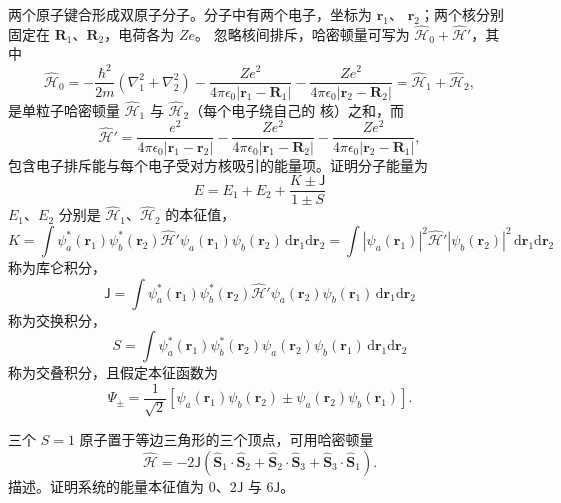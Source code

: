  两个原子键合形成双原子分子。分子中有两个电子，坐标为 $\mathbf{r}_1$、
$\mathbf{r}_2$；两个核分别固定在 $\mathbf{R}_1$、$\mathbf{R}_2$，电荷各为 $Ze$。
忽略核间排斥，哈密顿量可写为 $\hat{\mathcal{H}}_0+\hat{\mathcal{H}}'$，其中
\begin{equation*}
\hat{\mathcal{H}}_0 = -\frac{\hbar^{2}}{2m}(\nabla_1^{2}+\nabla_2^{2}) - \frac{Ze^{2}}{4\pi\epsilon_0|\mathbf{r}_1-\mathbf{R}_1|} - \frac{Ze^{2}}{4\pi\epsilon_0|\mathbf{r}_2-\mathbf{R}_2|} = \hat{\mathcal{H}}_1+\hat{\mathcal{H}}_2,\tag{4.27}
\end{equation*}
是单粒子哈密顿量 $\hat{\mathcal{H}}_1$ 与 $\hat{\mathcal{H}}_2$（每个电子绕自己的
核）之和，而
\begin{equation*}
\hat{\mathcal{H}}' = \frac{e^{2}}{4\pi\epsilon_0|\mathbf{r}_1-\mathbf{r}_2|} - \frac{Ze^{2}}{4\pi\epsilon_0|\mathbf{r}_1-\mathbf{R}_2|} - \frac{Ze^{2}}{4\pi\epsilon_0|\mathbf{r}_2-\mathbf{R}_1|},\tag{4.28}
\end{equation*}
包含电子排斥能与每个电子受对方核吸引的能量项。证明分子能量为
\begin{equation*}
E = E_1 + E_2 + \frac{K\pm\mathsf{J}}{1\pm S}\tag{4.29}
\end{equation*}
$E_1$、$E_2$ 分别是 $\hat{\mathcal{H}}_1$、$\hat{\mathcal{H}}_2$ 的本征值，
\begin{equation*}
K = \int\psi_a^{*}(\mathbf{r}_1)\psi_b^{*}(\mathbf{r}_2)\hat{\mathcal{H}}'\psi_a(\mathbf{r}_1)\psi_b(\mathbf{r}_2)\,\mathrm{d}\mathbf{r}_1\mathrm{d}\mathbf{r}_2 = \int|\psi_a(\mathbf{r}_1)|^{2}\hat{\mathcal{H}}'|\psi_b(\mathbf{r}_2)|^{2}\,\mathrm{d}\mathbf{r}_1\mathrm{d}\mathbf{r}_2\tag{4.30}
\end{equation*}
称为库仑积分，
\begin{equation*}
\mathsf{J} = \int\psi_a^{*}(\mathbf{r}_1)\psi_b^{*}(\mathbf{r}_2)\hat{\mathcal{H}}'\psi_a(\mathbf{r}_2)\psi_b(\mathbf{r}_1)\,\mathrm{d}\mathbf{r}_1\mathrm{d}\mathbf{r}_2\tag{4.31}
\end{equation*}
称为交换积分，
\begin{equation*}
S = \int\psi_a^{*}(\mathbf{r}_1)\psi_b^{*}(\mathbf{r}_2)\psi_a(\mathbf{r}_2)\psi_b(\mathbf{r}_1)\,\mathrm{d}\mathbf{r}_1\mathrm{d}\mathbf{r}_2\tag{4.32}
\end{equation*}
称为交叠积分，且假定本征函数为
\begin{equation*}
\Psi_{\pm} = \frac{1}{\sqrt{2}}\left[\psi_a(\mathbf{r}_1)\psi_b(\mathbf{r}_2)\pm\psi_a(\mathbf{r}_2)\psi_b(\mathbf{r}_1)\right].\tag{4.33}
\end{equation*}

 三个 $S=1$ 原子置于等边三角形的三个顶点，可用哈密顿量
\begin{equation*}
\hat{\mathcal{H}} = -2\mathsf{J}(\hat{\mathbf{S}}_1\cdot\hat{\mathbf{S}}_2+\hat{\mathbf{S}}_2\cdot\hat{\mathbf{S}}_3+\hat{\mathbf{S}}_3\cdot\hat{\mathbf{S}}_1).\tag{4.34}
\end{equation*}
描述。证明系统的能量本征值为 0、$2\mathsf{J}$ 与 $6\mathsf{J}$。
